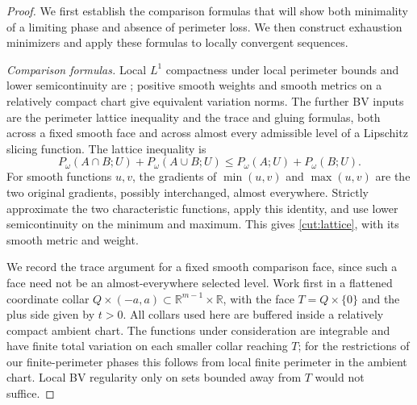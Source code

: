 \begin{proof}
We first establish the comparison formulas that will show both
minimality of a limiting phase and absence of perimeter loss. We then
construct exhaustion minimizers and apply these formulas to locally
convergent sequences.

\emph{Comparison formulas.}
Local $L^1$ compactness under local perimeter bounds and lower
semicontinuity are \citet[Chapter~2, Theorem~2.6]{simonGMT}; positive
smooth weights and smooth metrics on a relatively compact chart give
equivalent variation norms. The further BV inputs are the perimeter
lattice inequality and the trace and gluing formulas, both across a
fixed smooth face and across almost every admissible level of a
Lipschitz slicing function. The lattice inequality is
\begin{equation}\label{cut:lattice}
 P_\omega(A\cap B;U)+P_\omega(A\cup B;U)
          \le P_\omega(A;U)+P_\omega(B;U).
\end{equation}
For smooth functions $u,v$, the gradients of $\min(u,v)$
and $\max(u,v)$ are the two original gradients, possibly interchanged,
almost everywhere.  Strictly approximate the two characteristic
functions, apply this identity, and use lower semicontinuity on the
minimum and maximum.  This gives \eqref{cut:lattice}, with its smooth
metric and weight.

We record the trace argument for a fixed smooth comparison face, since
such a face need not be an almost-everywhere selected level.
Work first in a flattened coordinate collar
$Q\times(-a,a)\subset\mathbb R^{m-1}\times\mathbb R$, with the face
$T=Q\times\{0\}$ and the plus side given by $t>0$.
All collars used here are buffered inside a relatively compact ambient
chart.  The functions under consideration are integrable and have
finite total variation on each smaller collar reaching $T$; for the
restrictions of our finite-perimeter phases this follows from local
finite perimeter in the ambient chart.  Local BV regularity only on
sets bounded away from $T$ would not suffice.


\end{proof}
